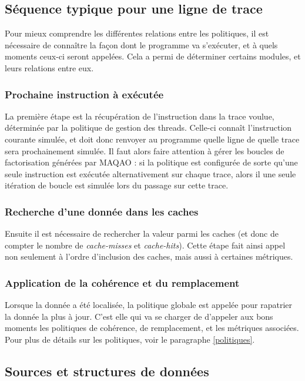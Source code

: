\subsection{Séquence typique pour une ligne de trace}

Pour mieux comprendre les différentes relations entre les politiques, il est nécessaire de connaître la façon dont le programme va s'exécuter, et à quels moments ceux-ci seront appelées. Cela a permi de déterminer certains modules, et leurs relations entre eux. 

\subsubsection{Prochaine instruction à exécutée}

La première étape est la récupération de l'instruction dans la trace voulue, déterminée par la politique de gestion des threads. Celle-ci connaît l'instruction courante simulée, et doit donc renvoyer au programme quelle ligne de quelle trace sera prochainement simulée. Il faut alors faire attention à gérer les boucles de factorisation générées par \textsc{MAQAO} : si la politique est configurée de sorte qu'une seule instruction est exécutée alternativement sur chaque trace, alors il une seule itération de boucle est simulée lors du passage sur cette trace. 

\subsubsection{Recherche d'une donnée dans les caches}

Ensuite il est nécessaire de rechercher la valeur parmi les caches (et donc de compter le nombre de \emph{cache-misses} et \emph{cache-hits}). Cette étape fait ainsi appel non seulement à l'ordre d'inclusion des caches, mais aussi à certaines métriques.

\subsubsection{Application de la cohérence et du remplacement}

 Lorsque la donnée a été localisée, la politique globale est appelée pour rapatrier la donnée la plus à jour. C'est elle qui va se charger de d'appeler aux bons moments les politiques de cohérence, de remplacement, et les métriques associées. Pour plus de détails sur les politiques, voir le paragraphe \ref{politiques}.

\subsection{Sources et structures de données}

